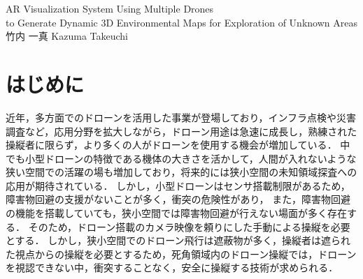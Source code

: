 \documentclass[a4paper,10pt,twocolumn,uplatex]{jsarticle}
\date{26}
\begin{document}
{AR Visualization System Using Multiple Drones \\to Generate Dynamic 3D Environmental Maps for Exploration of Unknown Areas}
{竹内 一真}
{Kazuma Takeuchi}


\section{はじめに}
近年，多方面でのドローンを活用した事業が登場しており，インフラ点検や災害調査など，応用分野を拡大しながら，ドローン用途は急速に成長し，熟練された操縦者に限らず，より多くの人がドローンを使用する機会が増加している\cite{Nonami}．
中でも小型ドローンの特徴である機体の大きさを活かして，人間が入れないような狭い空間での活躍の場も増加しており，将来的には狭小空間の未知領域探査への応用が期待されている．
しかし，小型ドローンはセンサ搭載制限があるため，障害物回避の支援がないことが多く，衝突の危険性があり，
また，障害物回避の機能を搭載していても，狭小空間では障害物回避が行えない場面が多く存在する\cite{syohou}．
そのため，ドローン搭載のカメラ映像を頼りにした手動による操縦を必要とする．
しかし，狭小空間でのドローン飛行は遮蔽物が多く，操縦者は遮られた視点からの操縦を必要とするため，死角領域内のドローン操縦では，ドローンを視認できない中，衝突することなく，安全に操縦する技術が求められる．
\end{document}
